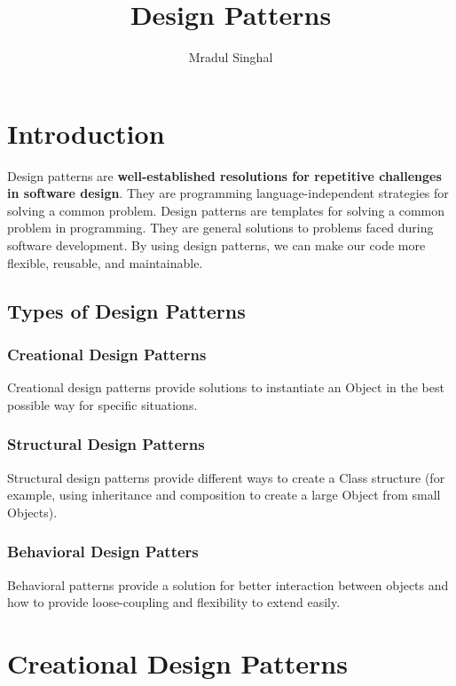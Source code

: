 \documentclass[12pt]{article}
\title{Design Patterns}
\author{Mradul Singhal}
\begin{document}
\maketitle
\newpage

\tableofcontents
\newpage

\section{Introduction}
Design patterns are \textbf{well-established resolutions for repetitive challenges in software design}. They are programming language-independent strategies for solving a common problem. Design patterns are templates for solving a common problem in programming. They are general solutions to problems faced during software development. By using design patterns, we can make our code more flexible, reusable, and maintainable.
\subsection{Types of Design Patterns}
\subsubsection{Creational Design Patterns}
Creational design patterns provide solutions to instantiate an Object in the best possible way for specific situations.
\subsubsection{Structural Design Patterns}
Structural design patterns provide different ways to create a Class structure (for example, using inheritance and composition to create a large Object from small Objects).
\subsubsection{Behavioral Design Patters}
Behavioral patterns provide a solution for better interaction between objects and how to provide loose-coupling and flexibility to extend easily.
\newpage

\section{Creational Design Patterns}
\end{document}
